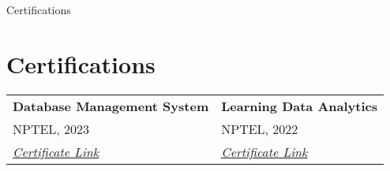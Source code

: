 \documentclass[a4paper,15pt]{article}
\begin{document}



Certifications
\section*{Certifications}
\begin{tabular}{@{}ll@{}}
    \textbf{Database Management System}                                                                                            &
    \textbf{Learning Data Analytics}                                                                                                 \\
    NPTEL, 2023                                                                                                                    &
    NPTEL, 2022                                                                                                                      \\
    \textit{\href{https://internalapp.nptel.ac.in/noc/Ecertificate/?q=NPTEL23CS41S1422070903136655}{\underline{Certificate Link}}} &
    \textit{\href{https://archive.nptel.ac.in/noc/Ecertificate/?q=NPTEL22GE26S3394039710215318}{\underline{Certificate Link}}}
\end{tabular}
\end{document}
